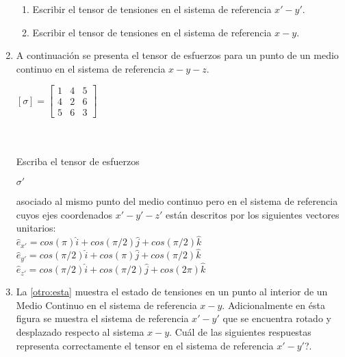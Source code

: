 \documentclass[../notas medios.tex]{subfiles}
\begin{document}
\begin{enumerate}
\begin{enumerate}
	\item Escribir el tensor de tensiones en el sistema de referencia $x'-y'$.
	\item Escribir el tensor de tensiones en el sistema de referencia $x-y$.
\end{enumerate}
\item \label{punto14} A continuaci\'on se presenta el tensor de esfuerzos para
un punto de un medio continuo en el sistema de referencia $x-y-z$.\\
\begin{large}
	$[\sigma] = \left[ \begin{array}{ccc}
	1 & 4 & 5 \\ 
	4 & 2 & 6 \\
	5 & 6 & 3
	\end{array}  \right] $ \\\\\\
\end{large}
%
Escriba el tensor de esfuerzos \begin{large} $\sigma'$ \end{large} asociado al
mismo punto del medio continuo pero en el sistema de referencia cuyos ejes
coordenados $x'-y'-z'$ est\'an descritos por los siguientes vectores unitarios:
\\
	$\hat{e}_{x'}= cos (\pi) \hat{i} + cos (\pi /2) \hat{j} + cos (\pi /2) \hat{k}$\\
	$\hat{e}_{y'}= cos (\pi /2) \hat{i} + cos (\pi) \hat{j} + cos (\pi /2) \hat{k}$\\
	$\hat{e}_{z'}= cos (\pi /2) \hat{i} + cos (\pi /2) \hat{j} + cos (2 \pi) \hat{k}$
\item \label{punto15} La \cref{otro:esta} muestra el estado de tensiones
en un punto al interior de un Medio Continuo en el sistema de referencia $x-y$. Adicionalmente en \'esta figura se muestra el sistema de referencia $x'-y'$ que se encuentra rotado y desplazado respecto al sistema $x-y$. \textquestiondown Cu\'al de las siguientes respuestas representa correctamente el tensor en el sistema de referencia $x'-y'$?.
%
	\begin{enumerate}
		\item $[\sigma] = \left[ \begin{array}{ccc}
			a & b \\ 
			b & -c
			\end{array}  \right] $
		\item $[\sigma] = \left[ \begin{array}{ccc}

\end{array}
\end{enumerate}
\end{enumerate}
\end{document}

